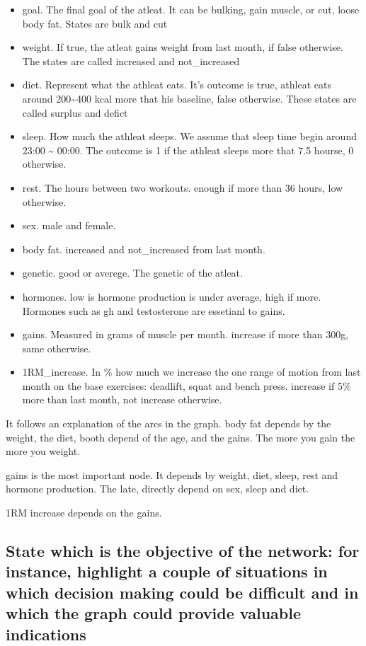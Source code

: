 \documentclass[11pt]{article}
\begin{document}
\begin{itemize}
\item
  goal. The final goal of the atleat. It can be bulking, gain muscle, or
  cut, loose body fat. States are bulk and cut
\item
  weight. If true, the atleat gains weight from last month, if false
  otherwise. The states are called increased and not\_increased
\item
  diet. Represent what the athleat eats. It's outcome is true, athleat
  eats around 200\textasciitilde{}400 kcal more that his baseline, false
  otherwise. These states are called surplus and defict
\item
  sleep. How much the athleat sleeps. We assume that sleep time begin
  around 23:00 \textasciitilde{} 00:00. The outcome is 1 if the athleat
  sleeps more that 7.5 hourse, 0 otherwise.
\item
  rest. The hours between two workouts. enough if more than 36 hours,
  low otherwise.
\item
  sex. male and female.
\item
  body fat. increased and not\_increased from last month.
\item
  genetic. good or averege. The genetic of the atleat.
\item
  hormones. low is hormone production is under average, high if more.
  Hormones such as gh and testosterone are essetianl to gains.
\item
  gains. Measured in grams of muscle per month. increase if more than
  300g, same otherwise.
\item
  1RM\_increase. In \% how much we increase the one range of motion from
  last month on the base exercises: deadlift, squat and bench press.
  increase if 5\% more than last month, not increase otherwise.
\end{itemize}

It follows an explanation of the arcs in the graph. body fat depends by
the weight, the diet, booth depend of the age, and the gains. The more
you gain the more you weight.

gains is the most important node. It depends by weight, diet, sleep,
rest and hormone production. The late, directly depend on sex, sleep and
diet.

1RM increase depends on the gains.

\subsection{State which is the objective of the network: for instance, highlight a couple of situations in which decision making could be difficult and in which the graph could provide valuable indications}
\end{document}
